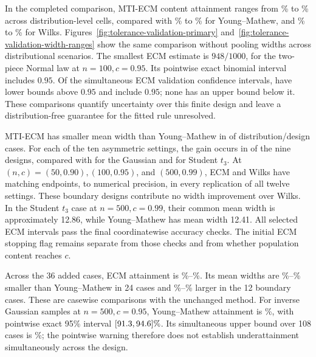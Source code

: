 \documentclass[11pt]{article}
\numberwithin{equation}{section}
\begin{document}
In the completed comparison, MTI-ECM content attainment ranges from
\MTIExpandedECMMin\% to \MTIExpandedECMMax\%
across distribution-level cells, compared with
\MTIExpandedYMMin\% to \MTIExpandedYMMax\% for Young--Mathew, and
\MTIExpandedWilksMin\% to \MTIExpandedWilksMax\% for Wilks.
Figures~\ref{fig:tolerance-validation-primary}
and~\ref{fig:tolerance-validation-width-ranges} show the same comparison without
pooling widths across distributional scenarios. The smallest ECM estimate is
\(948/1000\), for the two-piece Normal law at \(n=100,c=0.95\).
Its pointwise exact binomial interval includes \(0.95\).
Of the \MTIExpandedCases{} simultaneous ECM validation confidence intervals,
\MTIExpandedECMLower{} have lower bounds above \(0.95\) and
\MTIExpandedECMInclude{} include \(0.95\); none has an upper bound below it.
These comparisons quantify uncertainty over this finite design and leave a
distribution-free guarantee for the fitted rule unresolved.

MTI-ECM has smaller mean width than Young--Mathew in
\MTIExpandedECMShorter{} of \MTIExpandedCases{} distribution/design cases.
For each of the ten asymmetric settings, the gain occurs in \MTIFixedAsymmetricShorter{} of the nine
designs, compared with \MTIFixedNormalShorter{} for the Gaussian and
\MTIFixedStudentShorter{} for Student \(t_3\).
At \((n,c)=(50,0.90),(100,0.95)\), and \((500,0.99)\), ECM and Wilks
have matching endpoints, to numerical precision, in every replication of
all twelve settings. These boundary designs contribute no width improvement over
Wilks. In the Student \(t_3\) case at \(n=500,c=0.99\), their common mean
width is approximately 12.86, while Young--Mathew has mean width 12.41.
All selected ECM intervals pass the final coordinatewise accuracy checks.
The initial ECM stopping flag remains separate from those checks and from
whether population content reaches \(c\).

Across the 36 added cases, ECM attainment is
\MTIExpandedNewMin\%--\MTIExpandedNewMax\%. Its mean widths are
\MTIExpandedNewGainMin\%--\MTIExpandedNewGainMax\% smaller than
Young--Mathew in 24 cases and \MTIExpandedNewLossMin\%--\MTIExpandedNewLossMax\%
larger in the 12 boundary cases. These are casewise comparisons with the
unchanged method. For inverse Gaussian samples at \(n=500,c=0.95\),
Young--Mathew attainment is \MTIExpandedYMWarning\%, with pointwise exact
95\% interval \([91.3,94.6]\%\).
Its simultaneous upper bound over 108 cases is
\MTIExpandedYMWarningAdjustedUpper\%; the pointwise warning therefore does
not establish underattainment simultaneously across the design.
\end{document}
